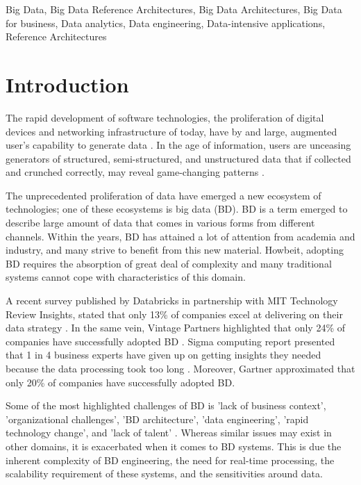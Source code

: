 \documentclass{ieeeaccess}
\begin{document}
\begin{keywords}
    Big Data, Big Data Reference Architectures, Big Data Architectures, Big Data for business, Data analytics, Data engineering, Data-intensive applications, Reference Architectures
\end{keywords}

\titlepgskip=-15pt

\maketitle

\section{Introduction}

The rapid development of software technologies, the proliferation of digital devices and networking infrastructure of today, have by and large, augmented user’s capability to generate data \cite{AtaeiSecurity}. In the age of information, users are unceasing generators of structured, semi-structured, and unstructured data that if collected and crunched correctly, may reveal game-changing patterns \cite{AtaeiACIS}.

The unprecedented proliferation of data have emerged a new ecosystem of technologies; one of these ecosystems is big data (BD)\cite{AtaeiHype}. BD is a term emerged to describe large amount of data that comes in various forms from different channels. Within the years, BD has attained a lot of attention from academia and industry, and many strive to benefit from this new material. Howbeit, adopting BD requires the absorption of great deal of complexity and many traditional systems cannot cope with characteristics of this domain. 

A recent survey published by Databricks in partnership with MIT Technology Review Insights, stated that only 13\% of companies excel at delivering on their data strategy \cite{DataBricks}. In the same vein, Vintage Partners highlighted that only 24\% of companies have successfully adopted BD \cite{NewVantageSurvey}. Sigma computing report presented that 1 in 4 business experts have given up on getting insights they needed because the data processing took too long \cite{SigmaSurvey}. Moreover, Gartner approximated that only 20\% of companies have successfully adopted BD. 

Some of the most highlighted challenges of BD is 'lack of business context', 'organizational challenges', 'BD architecture', 'data engineering', 'rapid technology change', and 'lack of talent' \cite{AtaeiBigDataEnvirons}. Whereas similar issues may exist in other domains, it is exacerbated when it comes to BD systems. This is due the inherent complexity of BD engineering, the need for real-time processing, the scalability requirement of these systems, and the sensitivities around data.
\end{document}
